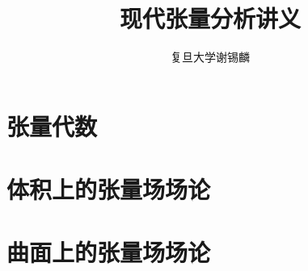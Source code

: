 \documentclass{notes-class}
\title{现代张量分析讲义}
\author{复旦大学\quad 谢锡麟}
\begin{document}
\frontmatter

\maketitle

\tableofcontents

\mainmatter

\part{张量代数}





\part{体积上的张量场场论}





\part{曲面上的张量场场论}

\end{document}
